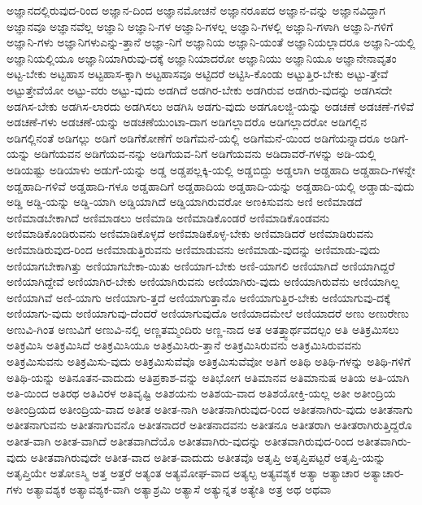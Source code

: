 {ಅಜ್ಞಾನದಲ್ಲಿರುವುದ-ರಿಂದ
ಅಜ್ಞಾನ-ದಿಂದ
ಅಜ್ಞಾನಮೋಚನೆ
ಅಜ್ಞಾನರೂಪದ
ಅಜ್ಞಾನ-ವನ್ನು
ಅಜ್ಞಾನವಿದ್ದಾಗ
ಅಜ್ಞಾನವೂ
ಅಜ್ಞಾನವೆಲ್ಲ
ಅಜ್ಞಾನಿ
ಅಜ್ಞಾನಿ-ಗಳ
ಅಜ್ಞಾನಿ-ಗಳಲ್ಲ
ಅಜ್ಞಾನಿ-ಗಳಲ್ಲಿ
ಅಜ್ಞಾನಿ-ಗಳಾಗಿ
ಅಜ್ಞಾನಿ-ಗಳಿಗೆ
ಅಜ್ಞಾನಿ-ಗಳು
ಅಜ್ಞಾನಿಗಳುಎನ್ನು-ತ್ತಾನೆ
ಅಜ್ಞಾ-ನಿಗೆ
ಅಜ್ಞಾನಿಯ
ಅಜ್ಞಾನಿ-ಯಂತೆ
ಅಜ್ಞಾನಿಯಲ್ಲಾದರೂ
ಅಜ್ಞಾನಿ-ಯಲ್ಲಿ
ಅಜ್ಞಾನಿಯಲ್ಲಿಯೂ
ಅಜ್ಞಾನಿಯಾಗಿರುವು-ದಕ್ಕೆ
ಅಜ್ಞಾನಿಯಾದರೋ
ಅಜ್ಞಾನಿಯು
ಅಜ್ಞಾನಿಯೂ
ಅಜ್ಞಾನೇನಾವೃತಂ
ಅಟ್ಟ-ಬೇಕು
ಅಟ್ಟಹಾಸ
ಅಟ್ಟಹಾಸ-ಕ್ಕಾಗಿ
ಅಟ್ಟಹಾಸವೂ
ಅಟ್ಟಿದರೆ
ಅಟ್ಟಿಸಿ-ಕೊಂಡು
ಅಟ್ಟುತ್ತಿರ-ಬೇಕು
ಅಟ್ಟು-ತ್ತೇವೆ
ಅಟ್ಟುತ್ತೇವೆಯೋ
ಅಟ್ಟು-ವರು
ಅಟ್ಟು-ವುದು
ಅಡಗಿದೆ
ಅಡಗಿರ-ಬೇಕು
ಅಡಗಿರುವ
ಅಡಗಿರು-ವುದನ್ನು
ಅಡಗಿಸದೇ
ಅಡಗಿಸ-ಬೇಕು
ಅಡಗಿಸ-ಲಾರದು
ಅಡಗಿಸಲು
ಅಡಗಿಸಿ
ಅಡಗು-ವುದು
ಅಡಗೂಲಜ್ಜಿ-ಯನ್ನು
ಅಡಚಣೆ
ಅಡಚಣೆ-ಗಳಿವೆ
ಅಡಚಣೆ-ಗಳು
ಅಡಚಣೆ-ಯನ್ನು
ಅಡಚಣೆಯುಂಟಾ-ದಾಗ
ಅಡಿಗಲ್ಲಾದರೊ
ಅಡಿಗಲ್ಲಾದರೋ
ಅಡಿಗಲ್ಲಿನ
ಅಡಿಗಲ್ಲಿನಂತೆ
ಅಡಿಗಲ್ಲು
ಅಡಿಗೆ
ಅಡಿಗೆಕೋಣೆಗೆ
ಅಡಿಗೆಮನೆ-ಯಲ್ಲಿ
ಅಡಿಗೆಮನೆ-ಯಿಂದ
ಅಡಿಗೆಯನ್ನಾದರೂ
ಅಡಿಗೆ-ಯನ್ನು
ಅಡಿಗೆಯವನ
ಅಡಿಗೆಯವ-ನನ್ನು
ಅಡಿಗೆಯವ-ನಿಗೆ
ಅಡಿಗೆಯವನು
ಅಡಿದಾವರೆ-ಗಳನ್ನು
ಅಡಿ-ಯಲ್ಲಿ
ಅಡಿಯಷ್ಟು
ಅಡಿಯಾಳು
ಅಡುಗೆ-ಯನ್ನು
ಅಡ್ಡ
ಅಡ್ಡಪಲ್ಲಕ್ಕಿ-ಯಲ್ಲಿ
ಅಡ್ಡಬಿದ್ದು
ಅಡ್ಡಲಾಗಿ
ಅಡ್ಡಹಾದಿ
ಅಡ್ಡಹಾದಿ-ಗಳನ್ನೇ
ಅಡ್ಡಹಾದಿ-ಗಳಿವೆ
ಅಡ್ಡಹಾದಿ-ಗಳೂ
ಅಡ್ಡಹಾದಿಗೆ
ಅಡ್ಡಹಾದಿಯ
ಅಡ್ಡಹಾದಿ-ಯನ್ನು
ಅಡ್ಡಹಾದಿ-ಯಲ್ಲಿ
ಅಡ್ಡಾಡು-ವುದು
ಅಡ್ಡಿ
ಅಡ್ಡಿ-ಯನ್ನು
ಅಡ್ಡಿ-ಯಾಗಿ
ಅಡ್ಡಿಯಾಗಿದೆ
ಅಡ್ಡಿಯಾಗಿರುವರೋ
ಅಣಕಿಸುವನು
ಅಣಿ
ಅಣಿಮಾಡದೆ
ಅಣಿಮಾಡಬೇಕಾಗಿದೆ
ಅಣಿಮಾಡಲು
ಅಣಿಮಾಡಿ
ಅಣಿಮಾಡಿಕೊಂಡರೆ
ಅಣಿಮಾಡಿಕೊಂಡವನು
ಅಣಿಮಾಡಿಕೊಂಡಿರುವನು
ಅಣಿಮಾಡಿಕೊಳ್ಳದೆ
ಅಣಿಮಾಡಿಕೊಳ್ಳ-ಬೇಕು
ಅಣಿಮಾಡಿದರೆ
ಅಣಿಮಾಡಿರುವನು
ಅಣಿಮಾಡಿರುವುದ-ರಿಂದ
ಅಣಿಮಾಡುತ್ತಿರುವನು
ಅಣಿಮಾಡುವನು
ಅಣಿಮಾಡು-ವುದನ್ನು
ಅಣಿಮಾಡು-ವುದು
ಅಣಿಯಾಗಬೇಕಾಗಿತ್ತು
ಅಣಿಯಾಗಬೇಕಾ-ಯಿತು
ಅಣಿಯಾಗ-ಬೇಕು
ಅಣಿ-ಯಾಗಲಿ
ಅಣಿಯಾಗಿದೆ
ಅಣಿಯಾಗಿದ್ದರೆ
ಅಣಿಯಾಗಿದ್ದೇವೆ
ಅಣಿಯಾಗಿರ-ಬೇಕು
ಅಣಿಯಾಗಿರುವನು
ಅಣಿಯಾಗಿರು-ವುದು
ಅಣಿಯಾಗಿರುವೆನು
ಅಣಿಯಾಗಿಲ್ಲ
ಅಣಿಯಾಗಿವೆ
ಅಣಿ-ಯಾಗು
ಅಣಿಯಾಗು-ತ್ತದೆ
ಅಣಿಯಾಗುತ್ತಾನೊ
ಅಣಿಯಾಗುತ್ತಿರ-ಬೇಕು
ಅಣಿಯಾಗುವು-ದಕ್ಕೆ
ಅಣಿಯಾಗು-ವುದು
ಅಣಿಯಾಗುವು-ದೆಂದರೆ
ಅಣಿಯಾಗುವುದೊ
ಅಣಿಯಾದಮೇಲೆ
ಅಣಿಯಾದರೆ
ಅಣು
ಅಣುರೇಣು
ಅಣುವಿ-ಗಿಂತ
ಅಣುವಿಗೆ
ಅಣುವಿ-ನಲ್ಲಿ
ಅಣ್ಣತಮ್ಮಂದಿರು
ಅಣ್ಣ-ನಾದ
ಅತ
ಅತತ್ತ್ವಾರ್ಥವದಲ್ಪಂ
ಅತಿ
ಅತಿಕ್ರಮಿಸಲು
ಅತಿಕ್ರಮಿಸಿ
ಅತಿಕ್ರಮಿಸಿದೆ
ಅತಿಕ್ರಮಿಸಿಯೂ
ಅತಿಕ್ರಮಿಸಿರು-ತ್ತಾನೆ
ಅತಿಕ್ರಮಿಸಿರುವನು
ಅತಿಕ್ರಮಿಸಿರುವವನು
ಅತಿಕ್ರಮಿಸುವನು
ಅತಿಕ್ರಮಿಸು-ವುದು
ಅತಿಕ್ರಮಿಸುವೆವೊ
ಅತಿಕ್ರಮಿಸುವೆವೋ
ಅತಿಗೆ
ಅತಿಥಿ
ಅತಿಥಿ-ಗಳನ್ನು
ಅತಿಥಿ-ಗಳಿಗೆ
ಅತಿಥಿ-ಯನ್ನು
ಅತಿನೂತನ-ವಾದುದು
ಅತಿಪ್ರಕಾಶ-ವನ್ನು
ಅತಿಭೋಗ
ಅತಿಮಾನವ
ಅತಿಮಾನುಷ
ಅತಿಯ
ಅತಿ-ಯಾಗಿ
ಅತಿ-ಯಿಂದ
ಅತಿರಥ
ಅತಿವಿರಳ
ಅತಿವೃಷ್ಟಿ
ಅತಿಶಯನು
ಅತಿಶಯ-ವಾದ
ಅತಿಶಯೋಕ್ತಿ-ಯಲ್ಲ
ಅತೀ
ಅತೀಂದ್ರಿಯ
ಅತೀಂದ್ರಿಯದ
ಅತೀಂದ್ರಿಯ-ವಾದ
ಅತೀತ
ಅತೀತ-ನಾಗಿ
ಅತೀತನಾಗಿರುವುದ-ರಿಂದ
ಅತೀತನಾಗಿರು-ವುದು
ಅತೀತನಾಗು
ಅತೀತನಾಗುವನು
ಅತೀತನಾಗುವನೊ
ಅತೀತನಾದರೆ
ಅತೀತನಾದವನು
ಅತೀತನೂ
ಅತೀತರಾಗಿ
ಅತೀತರಾಗಿರುತ್ತಿದ್ದರೊ
ಅತೀತ-ವಾಗಿ
ಅತೀತ-ವಾಗಿದೆ
ಅತೀತವಾಗಿದೆಯೊ
ಅತೀತವಾಗಿರು-ವುದನ್ನು
ಅತೀತವಾಗಿರುವುದ-ರಿಂದ
ಅತೀತವಾಗಿರು-ವುದು
ಅತೀತವಾಗಿರುವುದೇ
ಅತೀತ-ವಾದ
ಅತೀತ-ವಾದುದು
ಅತೀತವೊ
ಅತೃಪ್ತಿ
ಅತೃಪ್ತಿಪಟ್ಟರೆ
ಅತೃಪ್ತಿ-ಯನ್ನು
ಅತೃಪ್ತಿಯೇ
ಅತೋಽಸ್ಮಿ
ಅತ್ತ
ಅತ್ತರೆ
ಅತ್ಯಂತ
ಅತ್ಯಮೋಘ-ವಾದ
ಅತ್ಯಲ್ಪ
ಅತ್ಯವಶ್ಯಕ
ಅತ್ಯಾ
ಅತ್ಯಾಚಾರ
ಅತ್ಯಾಚಾರ-ಗಳು
ಅತ್ಯಾವಶ್ಯಕ
ಅತ್ಯಾವಶ್ಯಕ-ವಾಗಿ
ಅತ್ಯಾಶ್ರಮಿ
ಅತ್ಯಾಸೆ
ಅತ್ಯುನ್ನತ
ಅತ್ಯೇತಿ
ಅತ್ರ
ಅಥ
ಅಥವಾ
}
